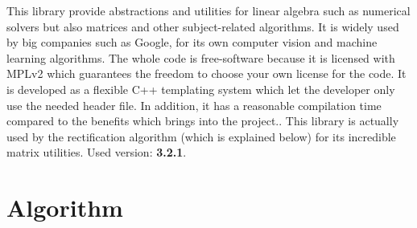 This library provide abstractions and utilities for linear algebra such as numerical solvers but also matrices and other subject-related algorithms.
It is widely used by big companies such as Google, for its own computer vision and machine learning algorithms.
The whole code is free-software because it is licensed with MPLv2 which guarantees the freedom to choose your own license for the code. It is developed as a flexible C++ templating system which let the developer only use the needed header file. In addition, it has a reasonable compilation time compared to the benefits which brings into the project.\cite{eigeninfo}.
This library is actually used by the rectification algorithm (which is explained below) for its incredible matrix utilities.
\newline Used version: \textbf{3.2.1}.

\section{Algorithm}
